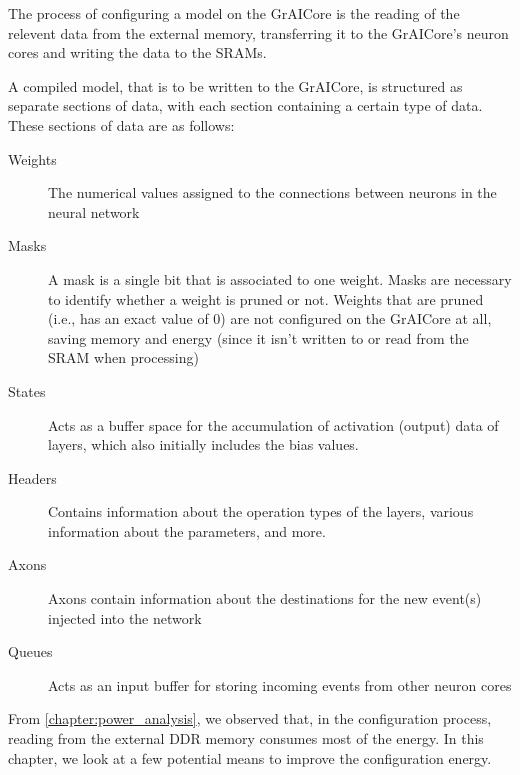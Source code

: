 The process of configuring a model on the GrAICore is the reading of the relevent data from the external memory, transferring it to the GrAICore's neuron cores and writing the data to the SRAMs.

A compiled model, that is to be written to the GrAICore, is structured as separate sections of data, with each section containing a certain type of data.
These sections of data are as follows:
\begin{description}
    \item[Weights] 
    The numerical values assigned to the connections between neurons in the neural network
    \item[Masks] 
    A mask is a single bit that is associated to one weight.
    Masks are necessary to identify whether a weight is pruned or not.
    Weights that are pruned (i.e., has an exact value of $0$) are not configured on the GrAICore at all, saving memory and energy (since it isn't written to or read from the SRAM when processing)
    \item[States] 
    Acts as a buffer space for the accumulation of activation (output) data of layers, which also initially includes the bias values.
    \item[Headers] 
    Contains information about the operation types of the layers, various information about the parameters, and more.
    \item[Axons] 
    Axons contain information about the destinations for the new event(s) injected into the network
    \item[Queues] 
    Acts as an input buffer for storing incoming events from other neuron cores 
\end{description}

From \cref{chapter:power_analysis}, we observed that, in the configuration process, reading from the external DDR memory consumes most of the energy.
In this chapter, we look at a few potential means to improve the configuration energy.

